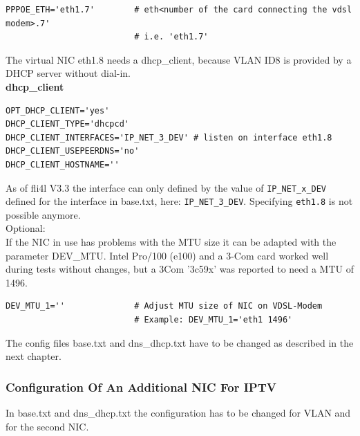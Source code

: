\begin{example}
\begin{verbatim}
PPPOE_ETH='eth1.7'        # eth<number of the card connecting the vdsl modem>.7'
                          # i.e. 'eth1.7'
\end{verbatim}
\end{example}

\noindent The virtual NIC eth1.8 needs a dhcp\_client, because VLAN
ID8 is provided by a DHCP server without dial-in.\\

\noindent \textbf{dhcp\_client}

\begin{example}
\begin{verbatim}
OPT_DHCP_CLIENT='yes'
DHCP_CLIENT_TYPE='dhcpcd'
DHCP_CLIENT_INTERFACES='IP_NET_3_DEV' # listen on interface eth1.8
DHCP_CLIENT_USEPEERDNS='no'
DHCP_CLIENT_HOSTNAME=''
\end{verbatim}
\end{example}

As of fli4l V3.3 the interface can only defined by the value of \texttt{IP\_NET\_x\_DEV}
defined for the interface in base.txt, here: \texttt{IP\_NET\_3\_DEV}. Specifying
\texttt{eth1.8} is not possible anymore.\\

\noindent Optional:\\
If the NIC in use has problems with the MTU size it can be adapted with the
parameter DEV\_MTU. Intel Pro/100 (e100) and a 3-Com card worked well during
tests without changes, but a 3Com '3c59x' was reported to need a MTU of 1496.

\begin{example}
\begin{verbatim}
DEV_MTU_1=''              # Adjust MTU size of NIC on VDSL-Modem
                          # Example: DEV_MTU_1='eth1 1496'
\end{verbatim}
\end{example}

The config files base.txt and dns\_dhcp.txt have to be changed as described
in the next chapter.\\

\subsubsection{Configuration Of An Additional NIC For IPTV}

In base.txt and dns\_dhcp.txt the configuration has to be changed for
VLAN and for the second NIC.\\

